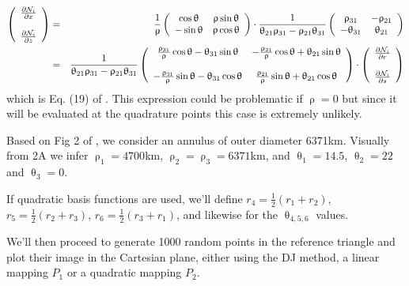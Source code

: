 \begin{eqnarray}
\left(
\begin{array}{c}    
\frac{\partial {\mathcal{N}}_i}{\partial x} \\ \\
\frac{\partial {\mathcal{N}}_i}{\partial z} 
\end{array}
\right)
&=&
\frac{1}{\uprho}
\left(
\begin{array}{cc}
\cos \uptheta & \uprho\sin\uptheta \\
-\sin\uptheta & \uprho\cos\uptheta
\end{array}
\right)\cdot
\frac{1}{\uptheta_{21}\uprho_{31}-\uprho_{21}\uptheta_{31}} 
\left(
\begin{array}{cc}
\uprho_{31} & -\uprho_{21} \\
-\uptheta_{31} & \uptheta_{21}
\end{array}
\right)
\nonumber\\
&=&
\frac{1}{\uptheta_{21}\uprho_{31}-\uprho_{21}\uptheta_{31}} 
\left(
\begin{array}{cc}
 \frac{\uprho_{31} }{\uprho} \cos\uptheta -\uptheta_{31}\sin\uptheta &  
-\frac{\uprho_{21} }{\uprho} \cos\uptheta +\uptheta_{21}\sin\uptheta \\ \\
-\frac{\uprho_{31} }{\uprho} \sin\uptheta -\uptheta_{31}\cos\uptheta &
 \frac{\uprho_{21} }{\uprho} \sin\uptheta +\uptheta_{21}\cos\uptheta 
\end{array}
\right)
\cdot
\left(
\begin{array}{c}
\frac{\partial {\mathcal{N}}_i}{\partial r} \\ \\
\frac{\partial {\mathcal{N}}_i}{\partial s} 
\end{array}
\right)
\end{eqnarray}
which is Eq. (19) of \textcite{moth20}.
This expression could be problematic if $\uprho=0$ but since it will be evaluated at the 
quadrature points this case is extremely unlikely.


Based on Fig 2 of \textcite{moth20}, we consider an annulus of outer diameter
6371km. Visually from 2A we infer $\uprho_1=4700$km, $\uprho_2=\uprho_3=6371$km, and 
$\uptheta_1=14.5$, $\uptheta_2=22$ and $\uptheta_3=0$.

If quadratic basis functions are used, we'll define 
$r_4=\frac12(r_1+r_2)$,
$r_5=\frac12(r_2+r_3)$,
$r_6=\frac12(r_3+r_1)$, and likewise for the $\uptheta_{4,5,6}$ values.

We'll then proceed to generate 1000 random points in the reference triangle and plot their image
in the Cartesian plane, either using the DJ method, a linear mapping $P_1$ or a quadratic mapping $P_2$.

